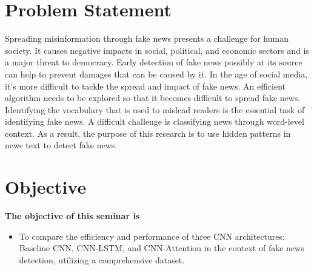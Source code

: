 \section{Problem Statement}

Spreading misinformation through fake news presents a challenge for human society. It causes negative impacts in social, political, and economic sectors and is a major threat to democracy. Early detection of fake news possibly at its source can help to prevent damages that can be caused by it. In the age of social media, it's more difficult to tackle the spread and impact of fake news. An efficient algorithm needs to be explored so that it becomes difficult to spread fake news. Identifying the vocabulary that is used to mislead readers is the essential task of identifying fake news. A difficult challenge is classifying news through word-level context. As a result, the purpose of this research is to use hidden patterns in news text to detect fake news.

\section{Objective}

\textbf{The objective of this seminar is}
\begin{itemize}
    \item To compare the efficiency and performance of three CNN architectures: Baseline CNN, CNN-LSTM, and CNN-Attention in the context of fake news detection, utilizing a comprehensive dataset.
\end{itemize}

\clearpage